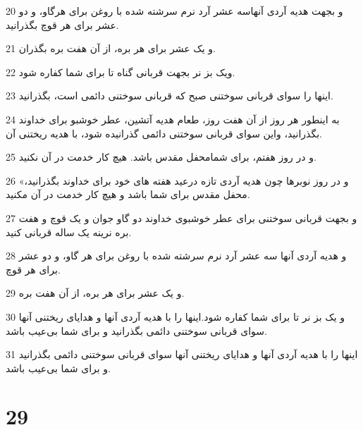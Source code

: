 \par 20 و بجهت هدیه آردی آنهاسه عشر آرد نرم سرشته شده با روغن برای هرگاو، و دو عشر برای هر قوچ بگذرانید.
\par 21 و یک عشر برای هر بره، از آن هفت بره بگذران.
\par 22 ویک بز نر بجهت قربانی گناه تا برای شما کفاره شود.
\par 23 اینها را سوای قربانی سوختنی صبح که قربانی سوختنی دائمی است، بگذرانید.
\par 24 به اینطور هر روز از آن هفت روز، طعام هدیه آتشین، عطر خوشبو برای خداوند بگذرانید، واین سوای قربانی سوختنی دائمی گذرانیده شود، با هدیه ریختنی آن.
\par 25 و در روز هفتم، برای شمامحفل مقدس باشد. هیچ کار خدمت در آن نکنید.
\par 26 «و در روز نوبرها چون هدیه آردی تازه درعید هفته های خود برای خداوند بگذرانید، محفل مقدس برای شما باشد و هیچ کار خدمت در آن مکنید.
\par 27 و بجهت قربانی سوختنی برای عطر خوشبوی خداوند دو گاو جوان و یک قوچ و هفت بره نرینه یک ساله قربانی کنید.
\par 28 و هدیه آردی آنها سه عشر آرد نرم سرشته شده با روغن برای هر گاو، و دو عشر برای هر قوچ.
\par 29 و یک عشر برای هر بره، از آن هفت بره.
\par 30 و یک بز نر تا برای شما کفاره شود.اینها را با هدیه آردی آنها و هدایای ریختنی آنها سوای قربانی سوختنی دائمی بگذرانید و برای شما بی‌عیب باشد. 
\par 31 اینها را با هدیه آردی آنها و هدایای ریختنی آنها سوای قربانی سوختنی دائمی بگذرانید و برای شما بی‌عیب باشد.
 
\chapter{29}

